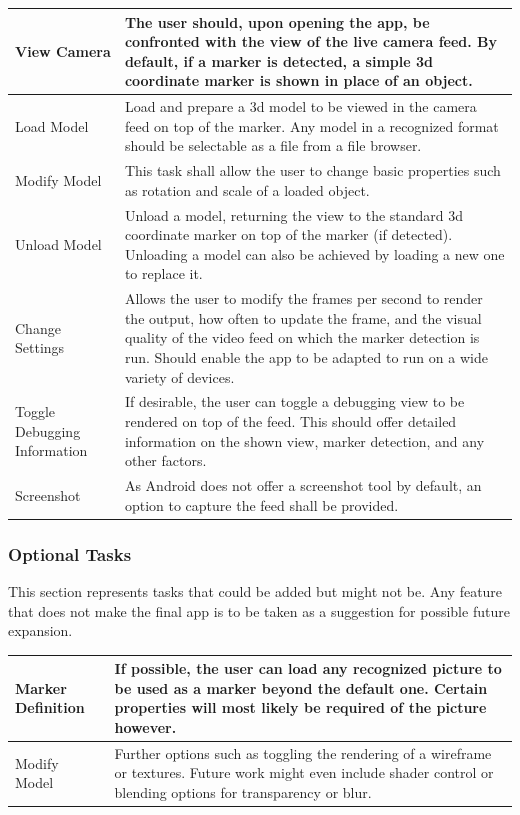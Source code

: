\begin{tabulary}{\textwidth}{L || L}
View Camera & The user should, upon opening the app, be confronted with the view of the live camera feed. By default, if a marker is detected, a simple 3d coordinate marker is shown in place of an object. \\
\hline
Load Model & Load and prepare a 3d model to be viewed in the camera feed on top of the marker. Any model in a recognized format should be selectable as a file from a file browser. \\
\hline
Modify Model & This task shall allow the user to change basic properties such as rotation and scale of a loaded object.\\
\hline
Unload Model & Unload a model, returning the view to the standard 3d coordinate marker on top of the marker (if detected). Unloading a model can also be achieved by loading a new one to replace it. \\
\hline
Change Settings & Allows the user to modify the frames per second to render the output, how often to update the frame, and the visual quality of the video feed on which the marker detection is run. Should enable the app to be adapted to run on a wide variety of devices.\\
\hline
Toggle Debugging Information & If desirable, the user can toggle a debugging view to be rendered on top of the feed. This should offer detailed information on the shown view, marker detection, and any other factors. \\
\hline
Screenshot & As Android does not offer a screenshot tool by default, an option to capture the feed shall be provided. \\
\end{tabulary}

\subsubsection*{Optional Tasks}

This section represents tasks that could be added but might not be.
Any feature that does not make the final app is to be taken as a suggestion for possible future expansion.

\begin{tabulary}{\textwidth}{L || L}
Marker Definition & If possible, the user can load any recognized picture to be used as a marker beyond the default one. Certain properties will most likely be required of the picture however. \\
\hline
Modify Model & Further options such as toggling the rendering of a wireframe or textures. Future work might even include shader control or blending options for transparency or blur.\\
\end{tabulary}

